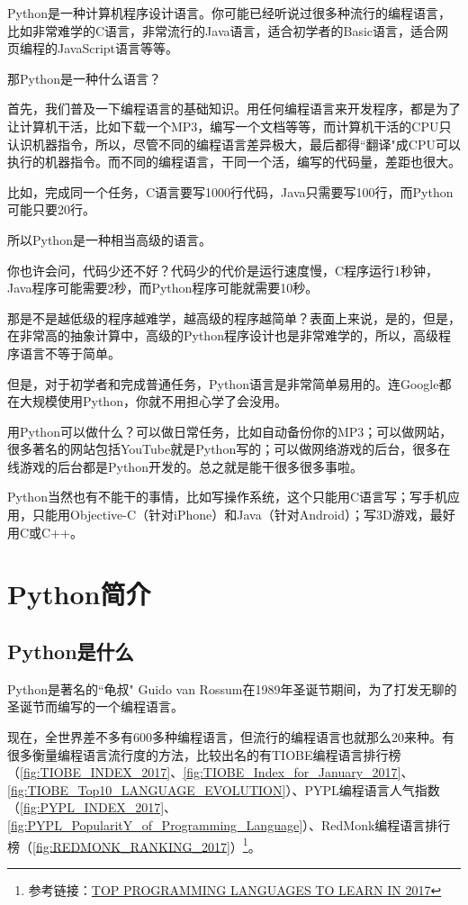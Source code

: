 Python是一种计算机程序设计语言。你可能已经听说过很多种流行的编程语言，比如非常难学的C语言，非常流行的Java语言，适合初学者的Basic语言，适合网页编程的JavaScript语言等等。

那Python是一种什么语言？

首先，我们普及一下编程语言的基础知识。用任何编程语言来开发程序，都是为了让计算机干活，比如下载一个MP3，编写一个文档等等，而计算机干活的CPU只认识机器指令，所以，尽管不同的编程语言差异极大，最后都得``翻译"成CPU可以执行的机器指令。而不同的编程语言，干同一个活，编写的代码量，差距也很大。

比如，完成同一个任务，C语言要写1000行代码，Java只需要写100行，而Python可能只要20行。

所以Python是一种相当高级的语言。

你也许会问，代码少还不好？代码少的代价是运行速度慢，C程序运行1秒钟，Java程序可能需要2秒，而Python程序可能就需要10秒。

那是不是越低级的程序越难学，越高级的程序越简单？表面上来说，是的，但是，在非常高的抽象计算中，高级的Python程序设计也是非常难学的，所以，高级程序语言不等于简单。

但是，对于初学者和完成普通任务，Python语言是非常简单易用的。连Google都在大规模使用Python，你就不用担心学了会没用。

用Python可以做什么？可以做日常任务，比如自动备份你的MP3；可以做网站，很多著名的网站包括YouTube就是Python写的；可以做网络游戏的后台，很多在线游戏的后台都是Python开发的。总之就是能干很多很多事啦。

Python当然也有不能干的事情，比如写操作系统，这个只能用C语言写；写手机应用，只能用Objective-C（针对iPhone）和Java（针对Android）；写3D游戏，最好用C或C++。

\section{Python简介}
\subsection{Python是什么}
Python是著名的``龟叔" Guido van Rossum在1989年圣诞节期间，为了打发无聊的圣诞节而编写的一个编程语言。

现在，全世界差不多有600多种编程语言，但流行的编程语言也就那么20来种。有很多衡量编程语言流行度的方法，比较出名的有TIOBE编程语言排行榜（\ref{fig:TIOBE_INDEX_2017}、\ref{fig:TIOBE_Index_for_January_2017}、\ref{fig:TIOBE_Top10_LANGUAGE_EVOLUTION}）、PYPL编程语言人气指数（\ref{fig:PYPL_INDEX_2017}、\ref{fig:PYPL_PopularitY_of_Programming_Language}）、RedMonk编程语言排行榜（\ref{fig:REDMONK_RANKING_2017}）\footnote{参考链接：\href{https://www.codingame.com/blog/top-programming-languages-to-learn-in-2017/}{TOP PROGRAMMING LANGUAGES TO LEARN IN 2017}}。

